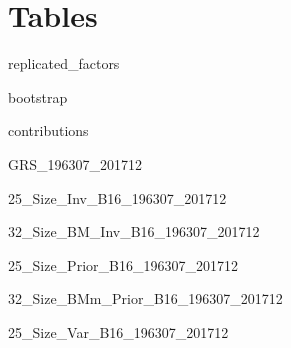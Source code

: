 
\section{Tables} \label{sec:tables}

{replicated_factors}

\begin{landscape}
{bootstrap}
\end{landscape}

{contributions}

{GRS_196307_201712}

{25_Size_Inv_B16_196307_201712}

\begin{landscape}
{32_Size_BM_Inv_B16_196307_201712}
\end{landscape}

{25_Size_Prior_B16_196307_201712}

\begin{landscape}
{32_Size_BMm_Prior_B16_196307_201712}
\end{landscape}

{25_Size_Var_B16_196307_201712}

